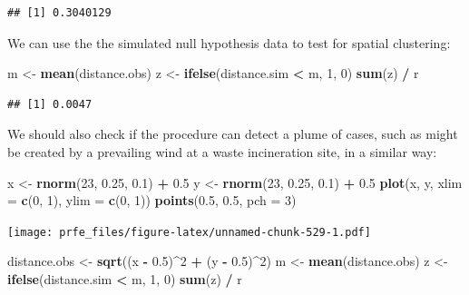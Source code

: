 \documentclass[12pt,a4paper]{book}
\newenvironment{Shaded}{\begin{snugshade}}{\end{snugshade}}
\newcommand{\KeywordTok}[1]{\textcolor[rgb]{0.13,0.29,0.53}{\textbf{#1}}}
\newcommand{\DataTypeTok}[1]{\textcolor[rgb]{0.13,0.29,0.53}{#1}}
\newcommand{\DecValTok}[1]{\textcolor[rgb]{0.00,0.00,0.81}{#1}}
\newcommand{\FloatTok}[1]{\textcolor[rgb]{0.00,0.00,0.81}{#1}}
\newcommand{\StringTok}[1]{\textcolor[rgb]{0.31,0.60,0.02}{#1}}
\newcommand{\OperatorTok}[1]{\textcolor[rgb]{0.81,0.36,0.00}{\textbf{#1}}}
\newcommand{\NormalTok}[1]{#1}
\theoremstyle{definition}
\theoremstyle{definition}
\theoremstyle{definition}
\theoremstyle{remark}
\begin{document}
\begin{verbatim}
## [1] 0.3040129
\end{verbatim}

We can use the the simulated null hypothesis data to test for spatial
clustering:

\begin{Shaded}
\begin{Highlighting}[]
\NormalTok{m <-}\StringTok{ }\KeywordTok{mean}\NormalTok{(distance.obs)}
\NormalTok{z <-}\StringTok{ }\KeywordTok{ifelse}\NormalTok{(distance.sim }\OperatorTok{<}\StringTok{ }\NormalTok{m, }\DecValTok{1}\NormalTok{, }\DecValTok{0}\NormalTok{)}
\KeywordTok{sum}\NormalTok{(z) }\OperatorTok{/}\StringTok{ }\NormalTok{r}
\end{Highlighting}
\end{Shaded}

\begin{verbatim}
## [1] 0.0047
\end{verbatim}

We should also check if the procedure can detect a plume of cases, such
as might be created by a prevailing wind at a waste incineration site,
in a similar way:

\begin{Shaded}
\begin{Highlighting}[]
\NormalTok{x <-}\StringTok{ }\KeywordTok{rnorm}\NormalTok{(}\DecValTok{23}\NormalTok{, }\FloatTok{0.25}\NormalTok{, }\FloatTok{0.1}\NormalTok{) }\OperatorTok{+}\StringTok{ }\FloatTok{0.5}
\NormalTok{y <-}\StringTok{ }\KeywordTok{rnorm}\NormalTok{(}\DecValTok{23}\NormalTok{, }\FloatTok{0.25}\NormalTok{, }\FloatTok{0.1}\NormalTok{) }\OperatorTok{+}\StringTok{ }\FloatTok{0.5}
\KeywordTok{plot}\NormalTok{(x, y, }\DataTypeTok{xlim =} \KeywordTok{c}\NormalTok{(}\DecValTok{0}\NormalTok{, }\DecValTok{1}\NormalTok{), }\DataTypeTok{ylim =} \KeywordTok{c}\NormalTok{(}\DecValTok{0}\NormalTok{, }\DecValTok{1}\NormalTok{))}
\KeywordTok{points}\NormalTok{(}\FloatTok{0.5}\NormalTok{, }\FloatTok{0.5}\NormalTok{, }\DataTypeTok{pch =} \DecValTok{3}\NormalTok{)}
\end{Highlighting}
\end{Shaded}

\texttt{[image: prfe\_files/figure-latex/unnamed-chunk-529-1.pdf]}

\begin{Shaded}
\begin{Highlighting}[]
\NormalTok{distance.obs <-}\StringTok{ }\KeywordTok{sqrt}\NormalTok{((x }\OperatorTok{-}\StringTok{ }\FloatTok{0.5}\NormalTok{)}\OperatorTok{^}\DecValTok{2} \OperatorTok{+}\StringTok{ }\NormalTok{(y }\OperatorTok{-}\StringTok{ }\FloatTok{0.5}\NormalTok{)}\OperatorTok{^}\DecValTok{2}\NormalTok{)}
\NormalTok{m <-}\StringTok{ }\KeywordTok{mean}\NormalTok{(distance.obs)}
\NormalTok{z <-}\StringTok{ }\KeywordTok{ifelse}\NormalTok{(distance.sim }\OperatorTok{<}\StringTok{ }\NormalTok{m, }\DecValTok{1}\NormalTok{, }\DecValTok{0}\NormalTok{)}
\KeywordTok{sum}\NormalTok{(z) }\OperatorTok{/}\StringTok{ }\NormalTok{r}
\end{Highlighting}
\end{Shaded}
\end{document}
